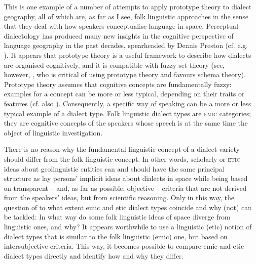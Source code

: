 \documentclass[output=paper]{LSP/langsci}
\begin{document}
This is one example of a number of attempts to apply prototype theory to dialect geography, all of which are, as far as I see, folk linguistic approaches \citep{christen_dialekt_1998,anders_was_2010,klausmann_wie_2006,kristiansen_style-shifting_2008,beeching_prototype-theoretic_2009} in the sense that they deal with how speakers conceptualise language in space. Perceptual dialectology has produced many new insights in the cognitive perspective of language geography in the past decades, spearheaded by Dennis Preston (cf. e.g. \citealt{preston_perceptual_1989,preston_handbook_1999,anders_perceptual_2010}). It appears that prototype theory \citep{rosch_natural_1973,lakoff_women_1987} is a useful framework to describe how dialects are organised cognitively, and it is compatible with fuzzy set theory (see, however, \citealt[218--250]{kretzschmar_linguistics_2009}, who is critical of using prototype theory and favours schema theory). Prototype theory assumes that cognitive concepts are fundamentally fuzzy: examples for a concept can be more or less typical, depending on their traits or features (cf. also \citealt{bailey_boundaries_1973}). Consequently, a specific way of speaking can be a more or less typical example of a dialect type. Folk linguistic dialect types are \textsc{emic} categories; they are cognitive concepts of the speakers whose speech is at the same time the object of linguistic investigation.

There is no reason why the fundamental linguistic concept of a dialect variety should differ from the folk linguistic concept. In other words, scholarly or \textsc{etic} ideas about geolinguistic entities can and should have the same principal structure as lay persons’ implicit ideas about dialects in space while being based on transparent – and, as far as possible, objective – criteria that are not derived from the speakers’ ideas, but from scientific reasoning. Only in this way, the question of to what extent emic and etic dialect types coincide and why (not) can be tackled: In what way do some folk linguistic ideas of space diverge from linguistic ones, and why? It appears worthwhile to use a linguistic (etic) notion of dialect types that is similar to the folk linguistic (emic) one, but based on intersubjective criteria. This way, it becomes possible to compare emic and etic dialect types directly and identify how and why they differ. 
\end{document}
